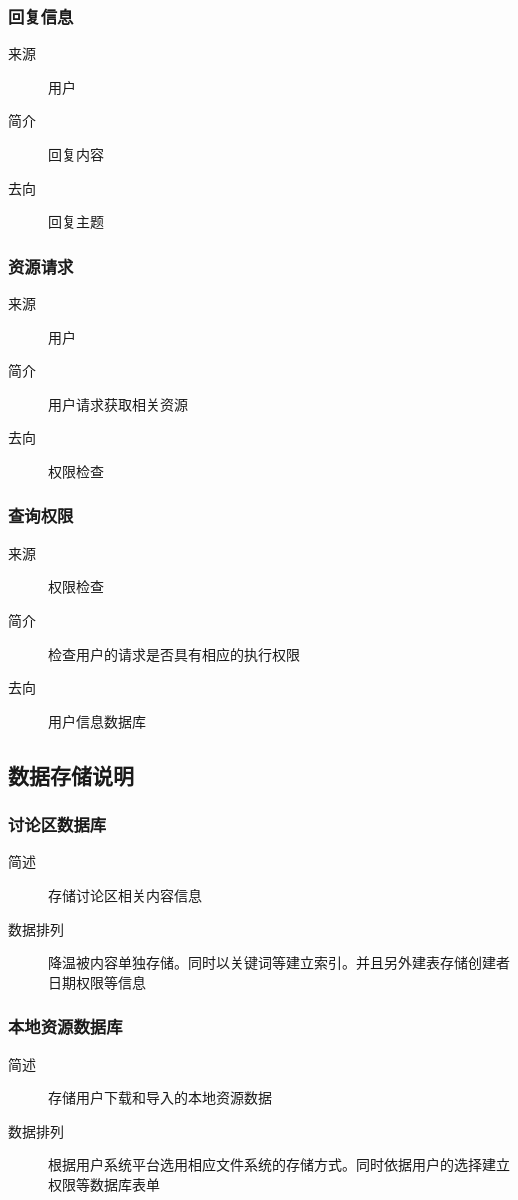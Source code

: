 \subsubsection{回复信息}
\begin{description}
  \item[来源] 用户
  \item[简介] 回复内容
  \item[去向] 回复主题
\end{description}

\subsubsection{资源请求}
\begin{description}
  \item[来源] 用户
  \item[简介] 用户请求获取相关资源
  \item[去向] 权限检查
\end{description}

\subsubsection{查询权限}
\begin{description}
  \item[来源] 权限检查
  \item[简介] 检查用户的请求是否具有相应的执行权限
  \item[去向] 用户信息数据库
\end{description}




\subsection{数据存储说明}
\subsubsection{讨论区数据库}
\begin{description}
  \item[简述] 存储讨论区相关内容信息
  \item[数据排列] 降温被内容单独存储。同时以关键词等建立索引。并且另外建表存储创建者日期权限等信息
\end{description}

\subsubsection{本地资源数据库}
\begin{description}
  \item[简述] 存储用户下载和导入的本地资源数据
  \item[数据排列] 根据用户系统平台选用相应文件系统的存储方式。同时依据用户的选择建立权限等数据库表单
\end{description}
